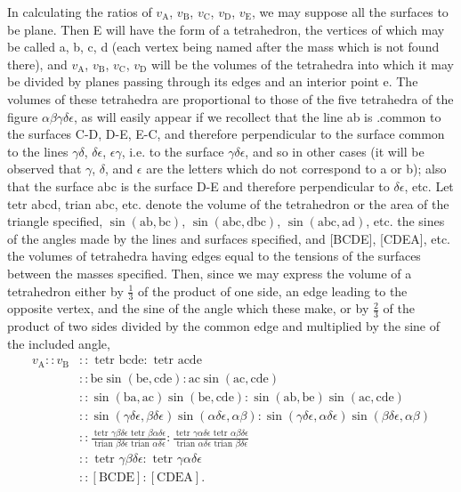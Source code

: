 \documentclass[12pt]{article}
\newcommand{\dd}{\delta}
\begin{document}
In calculating the ratios of $v_\text{A}$, $v_\text{B}$, $v_\text{C}$, $v_\text{D}$, $v_\text{E}$, we may suppose all the surfaces to be plane. Then E will have the form of a tetrahedron, the vertices of which may be called a, b, c, d (each vertex being named after the mass which is not found there), and $v_\text{A}$, $v_\text{B}$, $v_\text{C}$, $v_\text{D}$ will be the volumes of the tetrahedra into which it may be divided by planes passing through its edges and an interior point e. The volumes of these tetrahedra are proportional to those of the five tetrahedra of the figure $\alpha\beta\gamma\dd\epsilon$, as will easily appear if we recollect that the line ab is .common to the surfaces C-D, D-E, E-C, and therefore perpendicular to the surface common to the lines $\gamma\dd$, $\dd\epsilon$, $\epsilon\gamma$, i.e. to the surface $\gamma\dd\epsilon$, and so in other cases (it will be observed that $\gamma$, $\dd$, and $\epsilon$ are the letters which do not correspond to a or b); also that the surface abc is the surface D-E and therefore perpendicular to $\dd\epsilon$, etc. Let tetr abcd, trian abc, etc. denote the volume of the tetrahedron or the area of the triangle specified, $\sin (\text{ab}, \text{bc})$, $\sin (\text{abc}, \text{dbc})$, $\sin (\text{abc}, \text{ad})$, etc. the sines of the angles made by the lines and surfaces specified, and [BCDE], [CDEA], etc. the volumes of tetrahedra having edges equal to the tensions of the surfaces between the masses specified. Then, since we may express the volume of a tetrahedron either by $\tfrac{1}{3}$ of the product of one side, an edge leading to the opposite vertex, and the sine of the angle which these make, or by $\tfrac{2}{3}$ of the product of two sides divided by the common edge and multiplied by the sine of the included angle,
\begin{equation*} \begin{array}{cl}
v_\text{A} : :v_\text{B}  &:: \text{ tetr } \text{bcde}: \text{ tetr } \text{acde} \\
 &:: \text{be} \sin (\text{be}, \text{cde}): \text{ac} \sin (\text{ac}, \text{cde}) \\
 &:: \sin (\text{ba}, \text{ac}) \sin (\text{be}, \text{cde}): \sin (\text{ab}, \text{be}) \sin (\text{ac}, \text{cde}) \\
 &:: \sin (\gamma\dd\epsilon, \beta\dd\epsilon) \sin (\alpha\dd\epsilon, \alpha\beta) : \sin (\gamma\dd\epsilon, \alpha \dd \epsilon) \sin (\beta\dd\epsilon, \alpha\beta) \\
 &:: \frac{\text{ tetr } \gamma\beta\dd\epsilon \text{ tetr } \beta \alpha \dd \epsilon}{\text{ trian } \beta\dd\epsilon \text{ trian } \alpha\dd\epsilon} :
\frac{\text{ tetr } \gamma \alpha\dd\epsilon \text{ tetr } \alpha\beta \dd \epsilon }{ \text{ trian } \alpha\dd\epsilon \text{ trian } \beta\dd\epsilon } \\
 &:: \text{ tetr } \gamma\beta\dd \epsilon: \text{ tetr } \gamma\alpha\dd \epsilon \\
 &:: [\text{BCDE}]: [\text{CDEA}].\end{array}\end{equation*}
\end{document}
